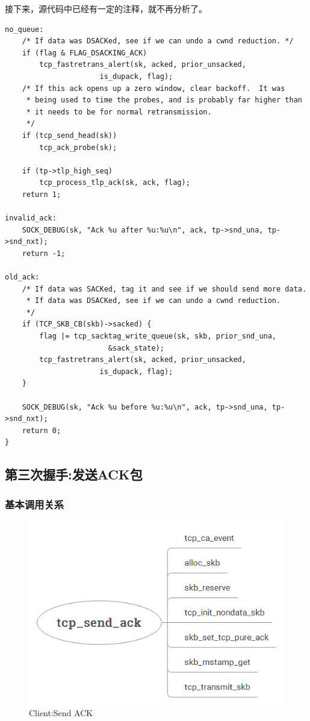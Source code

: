     接下来，源代码中已经有一定的注释，就不再分析了。
\begin{verbatim}
no_queue:
    /* If data was DSACKed, see if we can undo a cwnd reduction. */
    if (flag & FLAG_DSACKING_ACK)
        tcp_fastretrans_alert(sk, acked, prior_unsacked,
                      is_dupack, flag);
    /* If this ack opens up a zero window, clear backoff.  It was
     * being used to time the probes, and is probably far higher than
     * it needs to be for normal retransmission.
     */
    if (tcp_send_head(sk))
        tcp_ack_probe(sk);

    if (tp->tlp_high_seq)
        tcp_process_tlp_ack(sk, ack, flag);
    return 1;

invalid_ack:
    SOCK_DEBUG(sk, "Ack %u after %u:%u\n", ack, tp->snd_una, tp->snd_nxt);
    return -1;

old_ack:
    /* If data was SACKed, tag it and see if we should send more data.
     * If data was DSACKed, see if we can undo a cwnd reduction.
     */
    if (TCP_SKB_CB(skb)->sacked) {
        flag |= tcp_sacktag_write_queue(sk, skb, prior_snd_una,
                        &sack_state);
        tcp_fastretrans_alert(sk, acked, prior_unsacked,
                      is_dupack, flag);
    }

    SOCK_DEBUG(sk, "Ack %u before %u:%u\n", ack, tp->snd_una, tp->snd_nxt);
    return 0;
}
\end{verbatim} 
    \subsection{第三次握手:发送ACK包}
        \label{Client:send_ack}
        \subsubsection{基本调用关系}
                    \begin{figure}[htb]        
                        \centering
                        \includegraphics[width=\textwidth]  {images/Client:Send_ACK.png}
                        \caption{Client:Send ACK}
                        \label{Client:Send ACK}
                    \end{figure} 
        
